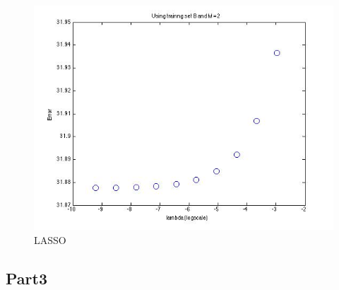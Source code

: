 \begin{figure}[!htb]
\endminipage\hfill
{}
  \includegraphics[width=\linewidth]{figures/p4_LASSO_regressB_m=2}
\endminipage\hfill
\caption{LASSO}
\end{figure}






\subsection{Part3}
